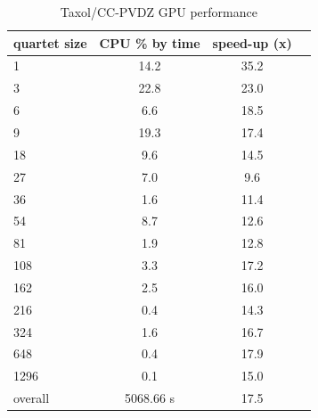 \documentclass[12pt]{article}
\begin{document}
\begin{table}
  \label{results2}
  \caption {Taxol/CC-PVDZ GPU performance}
  \begin{center}
    \begin{tabular}{| l | c | c | c |}
      \hline
      quartet size & CPU \% by time  &  speed-up (x)\\
      \hline
      1 & 14.2 & 35.2 \\
      3 & 22.8 & 23.0 \\
      6 & 6.6 & 18.5 \\
      9 & 19.3 & 17.4 \\
      18 & 9.6 & 14.5 \\
      27 & 7.0 & 9.6 \\
      36 & 1.6 & 11.4 \\
      54 & 8.7 & 12.6 \\
      81 & 1.9 & 12.8 \\
      108 & 3.3 & 17.2 \\
      162 & 2.5 & 16.0 \\
      216 & 0.4 & 14.3 \\
      324 & 1.6 & 16.7 \\
      648 & 0.4 & 17.9 \\
      1296 & 0.1 & 15.0 \\
      \hline
      overall & 5068.66 s &  17.5 \\
      \hline
    \end{tabular}
  \end{center}
\end{table}
\end{document}
